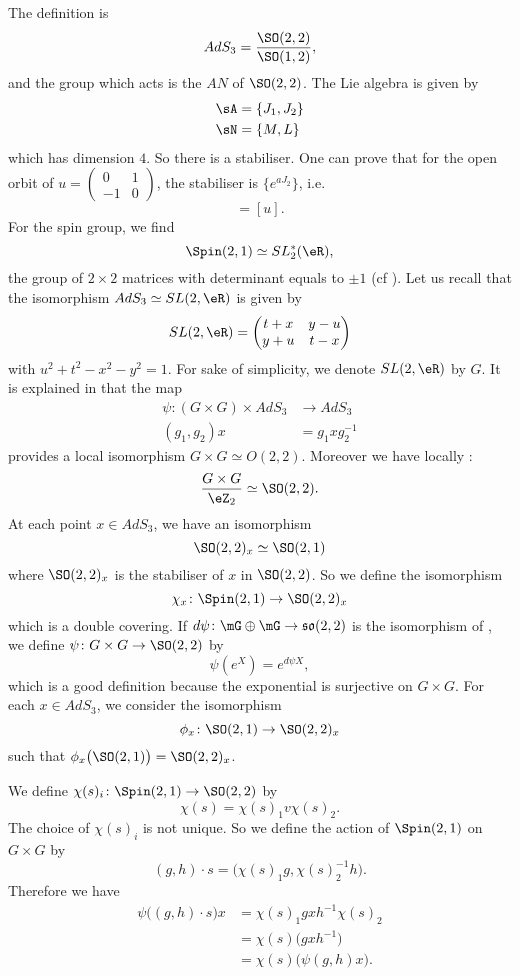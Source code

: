 The definition is 
\[ 
  AdS_{3}=\frac{ \SO(2,2) }{ \SO(1,2) },
\]
and the group which acts is the $AN$ of $\SO(2,2)$. The Lie algebra is given by
\[ 
\begin{split}
  \sA&=\{ J_{1},J_{2} \}\\
  \sN&=\{ M,L \}
\end{split}  
\]
which has dimension $4$. So there is a stabiliser. One can prove that for the open orbit of $u=\begin{pmatrix}
0&1\\-1&0
\end{pmatrix}$, the stabiliser is $\{  e^{aJ_{2}} \}$, i.e.
\begin{equation}
  [ e^{aJ_{2}}u]=[u].
\end{equation}
For the spin group, we find 
\[ 
  \Spin(2,1)\simeq SL_2^*(\eR),
\]
the group of $2\times 2$ matrices with determinant equals to $\pm 1$ (cf \cite{Michelson}). Let us recall that the isomorphism $AdS_{3}\simeq SL(2,\eR)$ is given by
\[ 
  SL(2,\eR)=\begin{pmatrix}
t+x&y-u\\
y+u&t-x
\end{pmatrix}
\]
with $u^{2}+t^{2}-x^{2}-y^{2}=1$. For sake of simplicity, we denote $SL(2,\eR)$ by $G$. It is explained in \cite{Clement} that the map
\begin{equation}
\begin{aligned}
 \psi\colon (G\times G)\times AdS_{3}&\to AdS_3 \\ 
(g_{1},g_{2})x&= g_{1}xg_{2}^{-1} 
\end{aligned}
\end{equation}
provides a local isomorphism $G\times G\simeq O(2,2)$. Moreover we have locally :
\[ 
  \frac{ G\times G }{ \eZ_{2} }\simeq \SO(2,2).
\]
At each point $x\in AdS_3$, we have an isomorphism
\[ 
  \SO(2,2)_{x}\simeq \SO(2,1)
\]
where $\SO(2,2)_{x}$ is the stabiliser of $x$ in $\SO(2,2)$. So we define the isomorphism
\[ 
  \chi_{x}\colon \Spin(2,1)\to \SO(2,2)_{x}
\]
which is a double covering. If $d\psi\colon \mG\oplus\mG\to \mathfrak{so}(2,2)$ is the isomorphism of \cite{Clement}, we define $\psi\colon G\times G\to \SO(2,2)$ by
\[ 
  \psi( e^{X})= e^{d\psi X},
\]
which is a good definition because the exponential is surjective on $G\times G$. For each $x\in AdS_3$, we consider the isomorphism
\[ 
  \phi_{x}\colon \SO(2,1)\to \SO(2,2)_{x}
\]
such that $\phi_{x}\big( \SO(2,1) \big)=\SO(2,2)_{x}$.

We define $\chi(s)_i\colon \Spin(2,1)\to \SO(2,2)$ by
\[ 
  \chi(s)=\chi(s)_1v\chi(s)_2.
\]
The choice of $\chi(s)_i$ is not unique. So we define the action of $\Spin(2,1)$ on $G\times G$ by
\begin{equation}
(g,h)\cdot s=\big( \chi(s)_1g,\chi(s)_2^{-1}h \big).
\end{equation}
Therefore we have
\[ 
\begin{split}
  \psi\big( (g,h)\cdot s \big)x&=\chi(s)_1gxh^{-1}\chi(s)_2\\
        &=\chi(s)\big( gxh^{-1} \big)\\
        &=\chi(s)\big(\psi(g,h)x\big).
\end{split}  
\]
